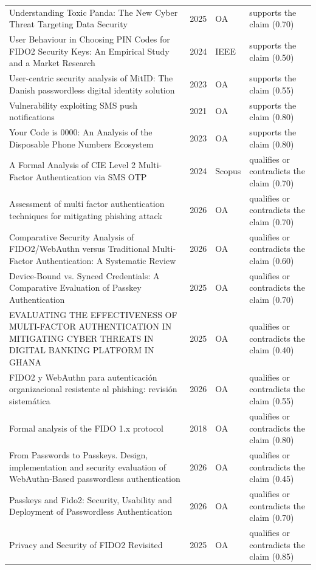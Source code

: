 \begin{longtable}{@{}%
  >{\raggedright\arraybackslash}p{}c%
  >{\raggedright\arraybackslash}p{}%
  >{\raggedright\arraybackslash}p{}@{}}
Understanding Toxic Panda: The New Cyber Threat Targeting Data Security & 2025 & OA & supports the claim (0.70) \\
User Behaviour in Choosing PIN Codes for FIDO2 Security Keys: An Empirical Study and a Market Research & 2024 & IEEE & supports the claim (0.50) \\
User-centric security analysis of MitID: The Danish passwordless digital identity solution & 2023 & OA & supports the claim (0.55) \\
Vulnerability exploiting SMS push notifications & 2021 & OA & supports the claim (0.80) \\
Your Code is 0000: An Analysis of the Disposable Phone Numbers Ecosystem & 2023 & OA & supports the claim (0.80) \\
A Formal Analysis of CIE Level 2 Multi-Factor Authentication via SMS OTP & 2024 & Scopus & qualifies or contradicts the claim (0.70) \\
Assessment of multi factor authentication techniques for mitigating phishing attack & 2026 & OA & qualifies or contradicts the claim (0.70) \\
Comparative Security Analysis of FIDO2/WebAuthn versus Traditional Multi-Factor Authentication: A Systematic Review & 2026 & OA & qualifies or contradicts the claim (0.60) \\
Device-Bound vs. Synced Credentials: A Comparative Evaluation of Passkey Authentication & 2025 & OA & qualifies or contradicts the claim (0.70) \\
EVALUATING THE EFFECTIVENESS OF MULTI-FACTOR AUTHENTICATION IN MITIGATING CYBER THREATS IN DIGITAL BANKING PLATFORM IN GHANA & 2025 & OA & qualifies or contradicts the claim (0.40) \\
FIDO2 y WebAuthn para autenticación organizacional resistente al phishing: revisión sistemática & 2026 & OA & qualifies or contradicts the claim (0.55) \\
Formal analysis of the FIDO 1.x protocol & 2018 & OA & qualifies or contradicts the claim (0.80) \\
From Passwords to Passkeys. Design, implementation and security evaluation of WebAuthn-Based passwordless authentication & 2026 & OA & qualifies or contradicts the claim (0.45) \\
Passkeys and Fido2: Security, Usability and Deployment of Passwordless Authentication & 2026 & OA & qualifies or contradicts the claim (0.70) \\
Privacy and Security of FIDO2 Revisited & 2025 & OA & qualifies or contradicts the claim (0.85) \\

\end{longtable}
